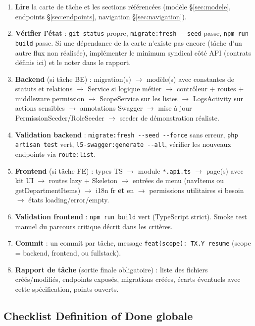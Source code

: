 \documentclass[11pt,a4paper]{article}
\begin{document}
\begin{enumerate}
  \item \textbf{Lire} la carte de tâche et les sections référencées (modèle §\ref{sec:modele}, endpoints §\ref{sec:endpoints}, navigation §\ref{sec:navigation}).
  \item \textbf{Vérifier l'état} : \verb|git status| propre, \verb|migrate:fresh --seed| passe, \verb|npm run build| passe. Si une dépendance de la carte n'existe pas encore (tâche d'un autre flux non réalisée), implémenter le minimum syndical côté API (contrats définis ici) et le noter dans le rapport.
  \item \textbf{Backend} (si tâche BE) : migration(s) $\rightarrow$ modèle(s) avec constantes de statuts et relations $\rightarrow$ Service si logique métier $\rightarrow$ contrôleur + routes + middleware permission $\rightarrow$ ScopeService sur les listes $\rightarrow$ LogsActivity sur actions sensibles $\rightarrow$ annotations Swagger $\rightarrow$ mise à jour PermissionSeeder/RoleSeeder $\rightarrow$ seeder de démonstration réaliste.
  \item \textbf{Validation backend} : \verb|migrate:fresh --seed --force| sans erreur, \verb|php artisan test| vert, \verb|l5-swagger:generate --all|, vérifier les nouveaux endpoints via \verb|route:list|.
  \item \textbf{Frontend} (si tâche FE) : types TS $\rightarrow$ module \verb|*.api.ts| $\rightarrow$ page(s) avec kit UI $\rightarrow$ routes lazy + Skeleton $\rightarrow$ entrées de menu (navItems ou getDepartmentItems) $\rightarrow$ i18n fr \textbf{et} en $\rightarrow$ permissions utilitaires si besoin $\rightarrow$ états loading/error/empty.
  \item \textbf{Validation frontend} : \verb|npm run build| vert (TypeScript strict). Smoke test manuel du parcours critique décrit dans les critères.
  \item \textbf{Commit} : un commit par tâche, message \verb|feat(scope): TX.Y resume| (scope = backend, frontend, ou fullstack).
  \item \textbf{Rapport de tâche} (sortie finale obligatoire) : liste des fichiers créés/modifiés, endpoints exposés, migrations créées, écarts éventuels avec cette spécification, points ouverts.
\end{enumerate}

\subsection{Checklist Definition of Done globale}
\end{document}
